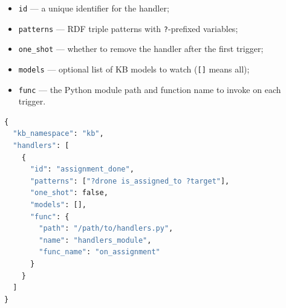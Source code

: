\documentclass[deliverable]{csreport}
\renewcommand{\code}[1]{\texttt{\textcolor{CSMaroon}{#1}}}%
\begin{document}
\begin{itemize}
  \item \code{id} --- a unique identifier for the handler;
  \item \code{patterns} --- RDF triple patterns with \code{?}-prefixed variables;
  \item \code{one\_shot} --- whether to remove the handler after the first trigger;
  \item \code{models} --- optional list of KB models to watch (\code{[]} means all);
  \item \code{func} --- the Python module path and function name to invoke on each trigger.
\end{itemize}

\begin{lstlisting}[language=Python, style=pycolors,caption={KB Monitor JSON configuration file}]
{
  "kb_namespace": "kb",
  "handlers": [
    {
      "id": "assignment_done",
      "patterns": ["?drone is_assigned_to ?target"],
      "one_shot": false,
      "models": [],
      "func": {
        "path": "/path/to/handlers.py",
        "name": "handlers_module",
        "func_name": "on_assignment"
      }
    }
  ]
}
\end{lstlisting}
\end{document}
